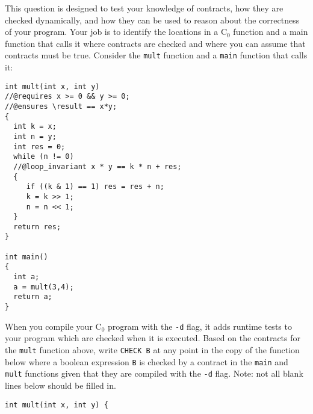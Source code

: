 \documentclass[12pt]{exam}
\newcommand\Cnought{C$_0$}
\begin{document}
\begin{questions}


\newpage

This question is designed to test your knowledge of contracts,
how they are checked dynamically, and how they can be used to reason
about the correctness of your program.  Your job is to identify the locations in a \Cnought{} function and a
main function that calls it where contracts are checked and where you can assume
that contracts must be true.  Consider the {\tt mult} function and a {\tt main} function that calls it:

\begin{verbatim}
int mult(int x, int y)
//@requires x >= 0 && y >= 0;
//@ensures \result == x*y;
{
  int k = x;
  int n = y;
  int res = 0;
  while (n != 0)
  //@loop_invariant x * y == k * n + res;
  {
     if ((k & 1) == 1) res = res + n;
     k = k >> 1;
     n = n << 1;
  }
  return res;
}

int main()
{
  int a;
  a = mult(3,4);
  return a;
}

\end{verbatim}
    \newpage


When you compile your \Cnought{} program with the {\tt -d} flag, it
	adds runtime tests to your program which are checked when it is executed.
	Based on the contracts for the {\tt mult} function above, write {\tt CHECK
	B} at any point in the copy of the function below where a boolean expression
	{\tt B} is checked by a contract in the {\tt main} and {\tt mult} functions
	given that they are compiled with the {\tt -d} flag. Note: not all blank
	lines below should be filled in.

\begin{verbatim}
int mult(int x, int y) {


\end{verbatim}
\end{questions}
\end{document}

